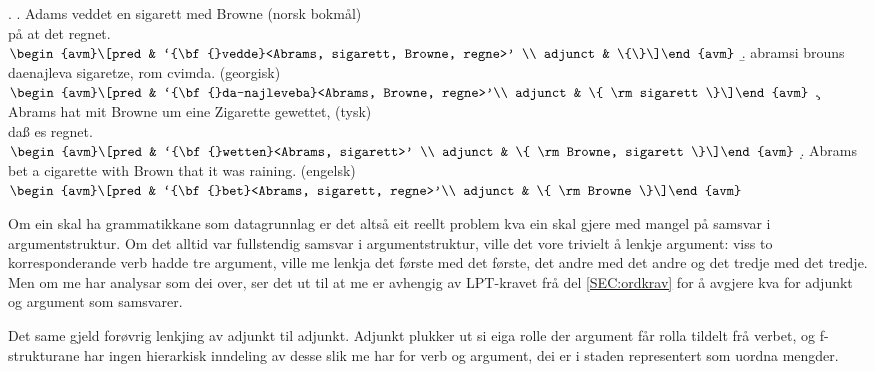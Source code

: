 \documentclass[11pt,a4paper,oneside,draft]{book}
\begin{document}
{\avmoptions{}
\ex. \label{vedde}
\a. Adams veddet en sigarett med Browne \hfill{} (norsk bokmål)\\ på at det regnet.\\
    $\\\begin{avm}\[pred & `{\bf{}vedde}<Abrams, sigarett, Browne, regne>' \\
                 adjunct & \{\}\]\end{avm}\\$
\b. abramsi brouns daenajleva sigaretze, rom cvimda. \hfill{} (georgisk)\\
    $\\\begin{avm}\[pred &  `{\bf{}da-najleveba}<Abrams, Browne, regne>'\\
    adjunct &  \{ \rm sigarett \}\]\end{avm}\\$ 
\c. Abrams hat mit Browne um eine Zigarette gewettet, \hfill{}(tysk)\\
    daß es regnet.\\
    $\\\begin{avm}\[pred & `{\bf{}wetten}<Abrams, sigarett>' \\
                  adjunct & \{ \rm Browne, sigarett \}\]\end{avm}\\$
\d. Abrams bet a cigarette with Brown that it was raining. \hfill{}(engelsk)\\
    $\\\begin{avm}\[pred & `{\bf{}bet}<Abrams, sigarett, regne>'\\
                  adjunct & \{ \rm Browne \}\]\end{avm}$

}

Om ein skal ha grammatikkane som datagrunnlag er det altså eit reellt
problem kva ein skal gjere med mangel på samsvar i
argumentstruktur. Om det alltid var fullstendig samsvar i
argumentstruktur, ville det vore trivielt å lenkje argument: viss to
korresponderande verb hadde tre argument, ville me lenkja det første
med det første, det andre med det andre og det tredje med det
tredje. Men om me har analysar som dei over, ser det ut til at me er
avhengig av LPT-kravet frå del \ref{SEC:ordkrav} for å avgjere kva for
adjunkt og argument som samsvarer.

Det same gjeld forøvrig lenkjing av adjunkt til adjunkt. Adjunkt
plukker ut si eiga rolle der argument får rolla tildelt frå verbet, og
f-strukturane har ingen hierarkisk inndeling av desse slik me har for
verb og argument, dei er i staden representert som uordna mengder.
\end{document}
